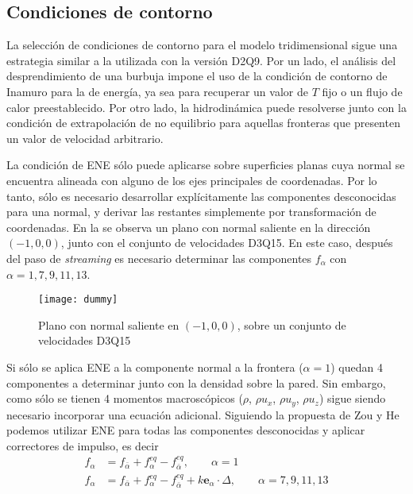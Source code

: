 \subsection{Condiciones de contorno}
\label{sec:nebb_d3q15}

La selecci\'on de condiciones de contorno para el modelo tridimensional sigue una estrategia similar a la utilizada con la versi\'on D2Q9. Por un lado, el an\'alisis del desprendimiento de una burbuja impone el uso de la condici\'on de contorno de Inamuro \cite{inamuro_lattice_2002} para la \lbe{} de energ\'ia, ya sea para recuperar un valor de $T$ fijo o un flujo de calor preestablecido. Por otro lado, la \lbe{} hidrodin\'amica puede resolverse junto con la condici\'on de extrapolaci\'on de no equilibrio para aquellas fronteras que presenten un valor de velocidad arbitrario.

La condici\'on de ENE s\'olo puede aplicarse sobre superficies planas cuya normal se encuentra alineada con alguno de los ejes principales de coordenadas. Por lo tanto, s\'olo es necesario desarrollar expl\'icitamente las componentes desconocidas para una normal, y derivar las restantes simplemente por transformaci\'on de coordenadas. En la  se observa un plano con normal saliente en la direcci\'on $(-1,0,0)$, junto con el conjunto de velocidades D3Q15. En este caso, despu\'es del paso de \emph{streaming} es necesario determinar las componentes $f_{\alpha}$ con $\alpha=1,7,9,11,13$. 
\begin{figure}[ht]
	\centering
	\texttt{[image: dummy]}
	\caption{Plano con normal saliente en $(-1,0,0)$, sobre un conjunto de velocidades D3Q15}
	\label{fig:d3q15_normal_plane}
\end{figure}

Si s\'olo se aplica ENE a la componente normal a la frontera ($\alpha=1$) quedan 4 componentes a determinar junto con la densidad sobre la pared. Sin embargo, como s\'olo se tienen 4 momentos macrosc\'opicos ($\rho$, $\rho u_x$, $\rho u_y$, $\rho u_z$) sigue siendo necesario incorporar una ecuaci\'on adicional. Siguiendo la propuesta de Zou y He \cite{zou_pressure_1997} podemos utilizar ENE para todas las componentes desconocidas y aplicar correctores de impulso, es decir 
\begin{equation}
	\begin{aligned}
		f_{\alpha} &= f_{\bar{\alpha}} + f_{\alpha}^{eq} - f_{\bar{\alpha}}^{eq}, \qquad  \alpha=1 \\
		f_{\alpha} &= f_{\bar{\alpha}} + f_{\alpha}^{eq} - f_{\bar{\alpha}}^{eq} + k \bm{e}_{\alpha} \cdot \Delta,    \qquad  \alpha=7,9,11,13
	\end{aligned}
\end{equation}

